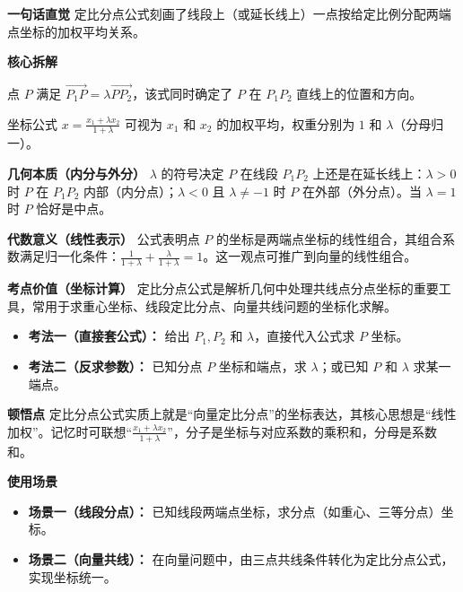 \begin{explanationbox}
	\textbf{\textcolor{CExplanation}{一句话直觉}}
	定比分点公式刻画了线段上（或延长线上）一点按给定比例分配两端点坐标的加权平均关系。

	\medskip
	\textbf{\textcolor{CExplanation}{核心拆解}}
	\begin{description}[style=nextline, leftmargin=2.8em, labelsep=0.5em, itemsep=0.45em]
		\item[\textbf{要点一（向量等式）：}]
			点 $P$ 满足 $\overrightarrow{P_1P} = \lambda \overrightarrow{PP_2}$，该式同时确定了 $P$ 在 $P_1P_2$ 直线上的位置和方向。
		\item[\textbf{要点二（加权平均）：}]
			坐标公式 $x=\frac{x_1+\lambda x_2}{1+\lambda}$ 可视为 $x_1$ 和 $x_2$ 的加权平均，权重分别为 $1$ 和 $\lambda$（分母归一）。
	\end{description}

	\medskip
	\textbf{\textcolor{CExplanation}{几何本质（内分与外分）}}
	$\lambda$ 的符号决定 $P$ 在线段 $P_1P_2$ 上还是在延长线上：$\lambda>0$ 时 $P$ 在 $P_1P_2$ 内部（内分点）；$\lambda<0$ 且 $\lambda\neq -1$ 时 $P$ 在外部（外分点）。当 $\lambda=1$ 时 $P$ 恰好是中点。

	\medskip
	\textbf{\textcolor{CExplanation}{代数意义（线性表示）}}
	公式表明点 $P$ 的坐标是两端点坐标的线性组合，其组合系数满足归一化条件：$\frac{1}{1+\lambda} + \frac{\lambda}{1+\lambda} = 1$。这一观点可推广到向量的线性组合。

	\medskip
	\textbf{\textcolor{CExplanation}{考点价值（坐标计算）}}
	定比分点公式是解析几何中处理共线点分点坐标的重要工具，常用于求重心坐标、线段定比分点、向量共线问题的坐标化求解。
	\begin{itemize}[leftmargin=*, itemsep=0.5em, topsep=0.4em]
		\item \textbf{考法一（直接套公式）：} 给出 $P_1,P_2$ 和 $\lambda$，直接代入公式求 $P$ 坐标。
		\item \textbf{考法二（反求参数）：} 已知分点 $P$ 坐标和端点，求 $\lambda$；或已知 $P$ 和 $\lambda$ 求某一端点。
	\end{itemize}

	\medskip
	\textbf{\textcolor{CExplanation}{顿悟点}}
	定比分点公式实质上就是“向量定比分点”的坐标表达，其核心思想是“线性加权”。记忆时可联想“$\frac{x_1+\lambda x_2}{1+\lambda}$”，分子是坐标与对应系数的乘积和，分母是系数和。

	\medskip
	\textbf{\textcolor{CExplanation}{使用场景}}
	\begin{itemize}[leftmargin=*, itemsep=0.5em, topsep=0.4em]
		\item \textbf{场景一（线段分点）：} 已知线段两端点坐标，求分点（如重心、三等分点）坐标。
		\item \textbf{场景二（向量共线）：} 在向量问题中，由三点共线条件转化为定比分点公式，实现坐标统一。
	\end{itemize}

\end{explanationbox}
